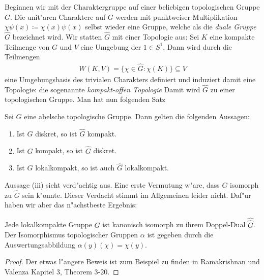 	Beginnen wir mit der Charaktergruppe auf einer beliebigen topologischen Gruppe $G$.
	Die unit"aren Charaktere auf $G$ werden mit punktweiser Multiplikation $\chi\psi (x) \coloneqq \chi(x) \psi (x)$ selbst wieder eine Gruppe, welche als die \emph{duale Gruppe $\hat{G}$} bezeichnet wird.
	Wir statten $\hat{G}$ mit einer Topologie aus:
	Sei $K$ eine kompakte Teilmenge von $G$ und $V$ eine Umgebung der $1\in S^1$.
	Dann wird durch die Teilmengen
	\begin{align*}
		W(K, V) = \{ \chi\in \hat{G}: \chi(K)\} \subseteq V
	\end{align*}
	eine Umgebungsbasis des trivialen Charakters definiert und induziert damit eine Topologie: die sogenannte \emph{kompakt-offen Topologie}
	Damit wird $\hat{G}$ zu einer topologischen Gruppe.
	Man hat nun folgenden Satz
	\begin{satz} Sei $G$ eine abelsche topologische Gruppe. Dann gelten die folgenden Aussagen:
		\begin{enumerate}[label=\emph{(\roman*)}]
			\item Ist $G$ diskret, so ist $\hat{G}$ kompakt.
			\item Ist $G$ kompakt, so ist $\hat{G}$ diskret.
			\item Ist $G$ lokalkompakt, so ist auch $\hat{G}$ lokalkompakt.
		\end{enumerate}
	\end{satz}
	Aussage (iii) sieht verd"achtig aus.
	Eine erste Vermutung w"are, dass $G$ isomorph zu $\hat{G}$ sein k"onnte.
	Dieser Verdacht stimmt im Allgemeinen leider nicht. 
	Daf"ur haben wir aber das n"achstbeste Ergebnis:
	\begin{satz}
		Jede lokalkompakte Gruppe $G$ ist kanonisch isomorph zu ihrem Doppel-Dual $\hat{\hat{G}}$.
		Der Isomorphismus topologischer Gruppen $\alpha$ ist gegeben durch die Auswertungsabbildung $\alpha(y)(\chi) = \chi(y)$.
	\end{satz}
	\begin{proof}
		Der etwas l"angere Beweis ist zum Beispiel zu finden in Ramakrishnan und Valenza \cite{rama} Kapitel 3, Theorem 3-20.
	\end{proof}
	
